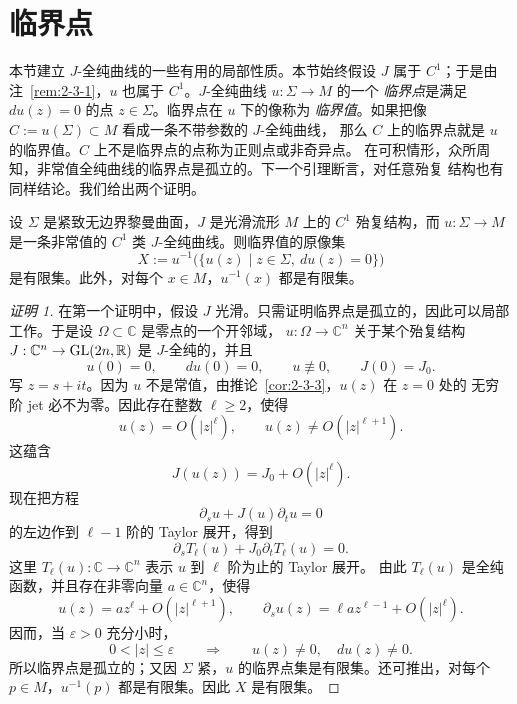 
\section{临界点}\label{sec:2-4}

本节建立 $J$-全纯曲线的一些有用的局部性质。本节始终假设 $J$ 属于 $C^1$；于是由
注~\ref{rem:2-3-1}，$u$ 也属于 $C^1$。$J$-全纯曲线 $u:\Sigma\to M$ 的一个
\emph{临界点}是满足 $du(z)=0$ 的点 $z\in\Sigma$。临界点在 $u$ 下的像称为
\emph{临界值}。如果把像 $C:=u(\Sigma)\subset M$ 看成一条不带参数的 $J$-全纯曲线，
那么 $C$ 上的临界点就是 $u$ 的临界值。$C$ 上不是临界点的点称为正则点或非奇异点。
在可积情形，众所周知，非常值全纯曲线的临界点是孤立的。下一个引理断言，对任意殆复
结构也有同样结论。我们给出两个证明。

\begin{lemma}\label{lem:2-4-1}
设 $\Sigma$ 是紧致无边界黎曼曲面，$J$ 是光滑流形 $M$ 上的 $C^1$ 殆复结构，而
$u:\Sigma\to M$ 是一条非常值的 $C^1$ 类 $J$-全纯曲线。则临界值的原像集
\[
  X:=u^{-1}\bigl(\{u(z)\mid z\in\Sigma,\ du(z)=0\}\bigr)
\]
是有限集。此外，对每个 $x\in M$，$u^{-1}(x)$ 都是有限集。
\end{lemma}

\begin{proof}[证明 1]
在第一个证明中，假设 $J$ 光滑。只需证明临界点是孤立的，因此可以局部工作。于是设
$\Omega\subset\mathbb C$ 是零点的一个开邻域，
$u:\Omega\to\mathbb C^n$ 关于某个殆复结构
$J:\mathbb C^n\to\operatorname{GL}(2n,\mathbb R)$ 是 $J$-全纯的，并且
\[
  u(0)=0,\qquad du(0)=0,\qquad u\not\equiv0,\qquad J(0)=J_0.
\]
写 $z=s+it$。因为 $u$ 不是常值，由推论~\ref{cor:2-3-3}，$u(z)$ 在 $z=0$ 处的
无穷阶 jet 必不为零。因此存在整数 $\ell\ge2$，使得
\[
  u(z)=O(|z|^\ell),\qquad u(z)\ne O(|z|^{\ell+1}).
\]
这蕴含
\[
  J(u(z))=J_0+O(|z|^\ell).
\]
现在把方程
\[
  \partial_su+J(u)\partial_tu=0
\]
的左边作到 $\ell-1$ 阶的 Taylor 展开，得到
\[
  \partial_sT_\ell(u)+J_0\partial_tT_\ell(u)=0.
\]
这里 $T_\ell(u):\mathbb C\to\mathbb C^n$ 表示 $u$ 到 $\ell$ 阶为止的 Taylor 展开。
由此 $T_\ell(u)$ 是全纯函数，并且存在非零向量 $a\in\mathbb C^n$，使得
\[
  u(z)=az^\ell+O(|z|^{\ell+1}),\qquad
  \partial_su(z)=\ell az^{\ell-1}+O(|z|^\ell).
\]
因而，当 $\varepsilon>0$ 充分小时，
\[
  0<|z|\le\varepsilon
  \qquad\Longrightarrow\qquad
  u(z)\ne0,\quad du(z)\ne0.
\]
所以临界点是孤立的；又因 $\Sigma$ 紧，$u$ 的临界点集是有限集。还可推出，对每个
$p\in M$，$u^{-1}(p)$ 都是有限集。因此 $X$ 是有限集。
\end{proof}

